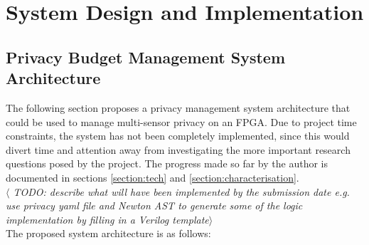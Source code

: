 \documentclass[12pt]{article}
\begin{document}
\section{System Design and Implementation}
  \subsection{Privacy Budget Management System Architecture} \label{subsection:privacy_budget_system_arch}
    The following section proposes a privacy management system architecture that could be used to manage multi-sensor privacy on an FPGA. Due to project time constraints, the system has not been completely implemented, since this would divert time and attention away from investigating the more important research questions posed by the project. The progress made so far by the author is documented in sections \ref{section:tech} and \ref{section:characterisation}.
    \\
    \textit{$\langle$ TODO: describe what will have been implemented by the submission date e.g. use privacy yaml file and Newton AST to generate some of the logic implementation by filling in a Verilog template$\rangle$}
    \\
    The proposed system architecture is as follows:
\end{document}
